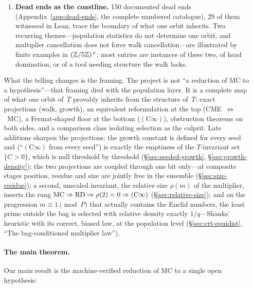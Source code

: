 \begin{enumerate}[nosep,leftmargin=*]
  falsifiable, and the discovery that the ``coincidence'' of consecutive
  confined stages has an algebraic family (the shifted tower).  The
  weakest class statement, infinitely many primes $\equiv 3 \pmod 4$, is
  shown to have no quadratic-field locus for its failure
  (Section~\ref{sec:exceptional}).
\item \textbf{Dead ends as the coastline.}  150 documented dead ends
  (Appendix~\ref{app:dead-ends}, the complete numbered catalogue), 29 of them
  witnessed in Lean, trace the
  boundary of what one orbit inherits.  Two recurring themes---population
  statistics do not determine one orbit, and multiplier cancellation does
  not force walk cancellation---are illustrated by finite examples in
  $(\mathbb{Z}/5\mathbb{Z})^\times$; most entries are instances of these two, of head
  domination, or of a tool needing structure the walk lacks.
\end{enumerate}

\noindent What the telling changes is the framing.  The project is not
``a reduction of MC to a hypothesis''---that framing died with the
population layer.  It is a complete map of what one orbit of~$T$
provably inherits from the structure of~$T$: exact projections (walk,
growth), an equivalent reformulation at the top (CME~$\iff$~MC), a Fermat-shaped floor
at the bottom ($(\mathrm{C}\infty)$), obstruction theorems on both sides,
and a comparison class isolating selection as the culprit.  Late
additions sharpen the projections: the growth constant is defined for
every seed and  (``$(\mathrm{C}\infty)$ from every
seed'') is exactly the emptiness of the $T$-invariant set $\{C>0\}$,
which is null threshold by threshold (\S\ref{sec:seeded-growth},
\S\ref{sec:growth-density}); the two projections are coupled through
one bit only---at composite stages position, residue and size are jointly
free in the ensemble (\S\ref{sec:size-residue}); a second, unscaled
invariant, the relative size $\rho(m)$ of the multiplier, inserts the rung
$\mathrm{MC} \Rightarrow \mathrm{RD} \Rightarrow \rho(2)=0 \Rightarrow
(\mathrm{C}\infty)$ (\S\ref{sec:relative-size}); and on the progression
$m \equiv 1 \pmod{P}$ that actually contains the Euclid numbers, the least
prime outside the bag is selected with relative density exactly
$1/q$---Shanks' heuristic with its correct, biased law, at the population
level (\S\ref{sec:crt-equidist}, ``The bag-conditioned multiplier law'').

\paragraph{The main theorem.}
Our main result is the machine-verified reduction of MC to a single
open hypothesis:

